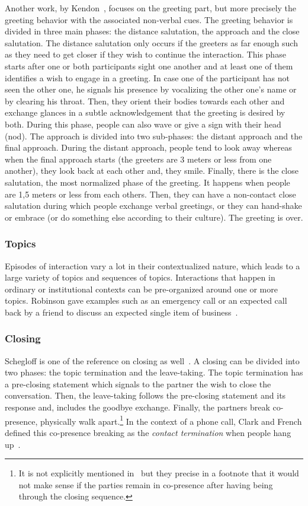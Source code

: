 \documentclass[a4paper,11pt,twoside]{StyleThese}
\begin{document}
Another work, by Kendon~\cite{kendon_1990_conducting}, focuses on the greeting part, but more precisely the greeting behavior with the associated non-verbal cues. The greeting behavior is divided in three main phases: the distance salutation, the approach and the close salutation. 
The distance salutation only occurs if the greeters as far enough such as they need to get closer if they wish to continue the interaction. This phase starts after one or both participants sight one another and at least one of them identifies a wish to engage in a greeting. In case one of the participant has not seen the other one, he signals his presence by vocalizing the other one’s name or by clearing his throat. Then, they orient their bodies towards each other and exchange glances in a subtle acknowledgement that the greeting is desired by both. During this phase, people can also wave or give a sign with their head (\eg nod).
The approach is divided into two sub-phases: the distant approach and the final approach. During the distant approach, people tend to look away whereas when the final approach starts (the greeters are 3 meters or less from one another), they look back at each other and, they smile.
Finally, there is the close salutation, the most normalized phase of the greeting. It happens when people are 1,5 meters or less from each others. Then, they can have a non-contact close salutation during which people exchange verbal greetings, or they can hand-shake or embrace (or do something else according to their culture). The greeting is over.

\subsubsection{Topics}
Episodes of interaction vary a lot in their contextualized nature, which leads to a large variety of topics and sequences of topics. Interactions that happen in ordinary or institutional contexts can be pre-organized around one or more topics. Robinson gave examples such as an emergency call or an expected call back by a friend to discuss an expected single item of business~\cite{robinson_overall_2012}.

\subsubsection{Closing}
Schegloff is one of the reference on closing as well~\cite{schegloff_1973_opening}. A closing can be divided into two phases: the topic termination and the leave-taking.
The topic termination has a pre-closing statement which signals to the partner the wish to close the conversation. Then, the leave-taking follows the pre-closing statement and its response and, includes the goodbye exchange. Finally, the partners break co-presence, \ie physically walk apart.\footnote{It is not explicitly mentioned in~\cite{schegloff_1973_opening}  but they precise in a footnote that it would not make sense if the parties remain in co-presence after having being through the closing sequence.} In the context of a phone call, Clark and French defined this co-presence breaking as the \textit{contact termination} when people hang up~\cite{clark_1981_telephone}.
\end{document}
